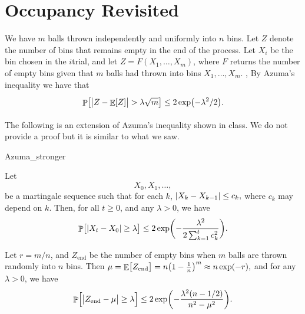 \section{Occupancy Revisited}

We have $m$ balls thrown independently and uniformly into $n$ bins.
Let $Z$ denote the number of bins that remains empty in the end of the
process.  Let $X_i$ be the bin chosen in the $i$\th trial, and let
$Z = F(X_1,\ldots, X_m)$, where $F$ returns the number of empty bins
given that $m$ balls had thrown into bins $X_1, \ldots,X_m$.  , By
Azuma's inequality we have that
\begin{equation*}
    \Bigl. \Prob{ \cardin{\bigl. Z - \Ex{Z} } > \lambda \sqrt{m}} \leq
    2\exp\pth{-\lambda^2/2}.
\end{equation*}


The following is an extension of Azuma's inequality shown in class. We
do not provide a proof but it is similar to what we saw.

\begin{fragment}{Azuma_stronger}
\begin{theorem}
    Let 
    \begin{equation*}
        X_0, X_1, \ldots,
    \end{equation*}
    be a martingale sequence such
    that for each $k$,
    \begin{math}
        \bigl.  \left| {X_k - X_{k-1}} \right| \leq c_k,
    \end{math}
    where $c_k$ may depend on $k$. Then, for all $t \geq 0$, and any
    $\lambda>0$, we have
    \begin{equation*}
        \Prob{\bigl. \cardin{X_t - X_0} \geq \lambda }%
        \leq%
        2
        \exp\biggl( - \frac{\lambda^2}{2\sum_{k=1}^{t} c_k^2} \biggr).
    \end{equation*}
\end{theorem}
\end{fragment}


\begin{theorem}
    Let $r= m/n$, and $Z_{\textrm{end}}$ be the number of empty bins when
    $m$ balls are thrown randomly into $n$ bins. Then
    \begin{math}
        \mu = \Ex{\bigl. Z_{\textrm{end}}} = n \pth[]{1-\frac{1}{n}}^m
        \approx n \exp(-r),
    \end{math}
    and for any $\lambda > 0$, we have
    \begin{equation*}
        \Prob{ \Bigl. \cardin{\bigl. Z_{\textrm{end}} -
              \mu} \geq \lambda } \leq 2 \exp \pth{ -
           \frac{\lambda^2(n-1/2)}{n^2 - \mu^2}}.        
    \end{equation*}
\end{theorem}

